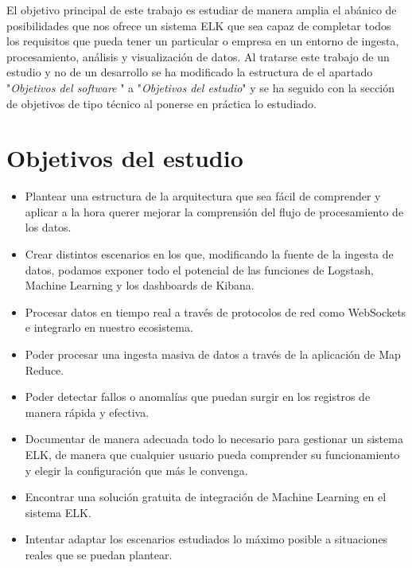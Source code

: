 
El objetivo principal de este trabajo es estudiar de manera amplia el abánico de posibilidades que nos ofrece un sistema ELK que sea capaz de completar todos los requisitos que pueda tener un particular o empresa en un entorno de ingesta, procesamiento, análisis y visualización de datos. Al tratarse este trabajo de un estudio y no de un desarrollo se ha modificado la estructura de el apartado "\textit{Objetivos del software }" a "\textit{Objetivos del estudio}" y se ha seguido con la sección de objetivos de tipo técnico al ponerse en práctica lo estudiado. 

\section{Objetivos del estudio}
\begin{itemize}
    \item Plantear una estructura de la arquitectura que sea fácil de comprender y aplicar a la hora querer mejorar la comprensión del flujo de procesamiento de los datos.
    \item Crear distintos escenarios en los que, modificando la fuente de la ingesta de datos, podamos exponer todo el potencial de las funciones de Logstash, Machine Learning y los dashboards de Kibana.
    \item Procesar datos en tiempo real a través de protocolos de red como WebSockets e integrarlo en nuestro ecosistema.
    \item Poder procesar una ingesta masiva de datos a través de la aplicación de Map Reduce.
    \item Poder detectar fallos o anomalías que puedan surgir en los registros de manera rápida y efectiva. 
    \item Documentar de manera adecuada todo lo necesario para gestionar un sistema ELK, de manera que cualquier usuario pueda comprender su funcionamiento y elegir la configuración que más le convenga.
    \item Encontrar una solución gratuita de integración de Machine Learning en el sistema ELK.
    \item     Intentar adaptar los escenarios estudiados lo máximo posible a situaciones reales que se puedan plantear.
\end{itemize}

